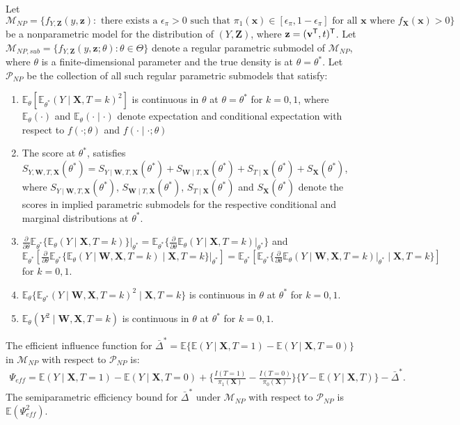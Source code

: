 \documentclass[useAMS,referee,usenatbib]{biom}
\def\bx{\mathbf{x}}
\def\bX{\mathbf{X}}
\def\bW{\mathbf{W}}
\def\bZ{\mathbf{Z}}
\def\bz{\mathbf{z}}
\def\bv{\mathbf{v}}
\def\Deltabarstr{\bar{\Delta}^*}
\def\thetastr{\theta^*}
\def\Mscr{\mathcal{M}}
\def\Pscr{\mathcal{P}}
\def\trans{^{\sf \tiny T}}
\def\ddtheta{\frac{\partial}{\partial\theta}}
\def\E{\mathbb{E}}
\begin{document}
\begin{lemma}
\label{l:npbnd}
Let $\Mscr_{NP} = \{ f_{Y,\bZ}(y,\bz) : \text{ there exists a } \epsilon_{\pi} > 0 \text{ such that } \pi_1(\bx) \in [\epsilon_{\pi},1-\epsilon_{\pi}] \text{ for all } \bx \text{ where } f_{\bX}(\bx)>0\}$ be a nonparametric model for the distribution of $(Y,\bZ)$, where $\bz=(\bv\trans,t)\trans$.  Let $\Mscr_{NP,sub} = \{ f_{Y,\bZ}(y,\bz;\theta):\theta \in \Theta\}$ denote a regular parametric submodel of $\Mscr_{NP}$, where $\theta$ is a finite-dimensional parameter and the true density is at $\theta=\thetastr$.  Let $\Pscr_{NP}$ be the collection of all such regular parametric submodels that satisfy:
\begin{enumerate}
\item $\E_{\theta}[\E_{\thetastr}(Y\mid\bX,T=k)^2]$ is continuous in $\theta$ at $\theta=\thetastr$ for $k=0,1$, where $\E_{\theta}(\cdot)$ and $\E_{\theta}(\cdot \mid \cdot)$ denote expectation and conditional expectation with respect to $f(\cdot;\theta)$ and $f(\cdot\mid\cdot;\theta)$
\item The score at $\thetastr$, satisfies $S_{Y,\bW,T,\bX}(\thetastr)=S_{Y\mid\bW,T,\bX}(\thetastr)+ S_{\bW\mid T,\bX}(\thetastr) + S_{T\mid \bX}(\thetastr) + S_{\bX}(\thetastr)$, where $S_{Y\mid \bW,T,\bX}(\thetastr)$, $S_{\bW\mid T,\bX}(\thetastr)$, $S_{T\mid \bX}(\thetastr)$ and $S_{\bX}(\thetastr)$ denote the scores in implied parametric submodels for the respective conditional and marginal distributions at $\thetastr$.
\item $\ddtheta \E_{\thetastr}\{ \E_{\theta}(Y\mid \bX,T=k)\}\Big|_{\thetastr} = \E_{\thetastr}\{ \ddtheta \E_{\theta}(Y\mid \bX,T=k)\Big|_{\thetastr}\}$ and $\E_{\thetastr}[ \ddtheta \E_{\thetastr}\{\E_{\theta}(Y\mid \bW,\bX,T=k)\mid \bX,T=k\}\Big|_{\thetastr}]= \E_{\thetastr}[ \E_{\thetastr}\{\ddtheta \E_{\theta}(Y\mid \bW,\bX,T=k)\Big|_{\thetastr}\mid \bX,T=k\}]$ for $k=0,1$.
\item $\E_{\theta}\{ \E_{\thetastr}(Y\mid \bW,\bX,T=k)^2\mid \bX,T=k\}$ is continuous in $\theta$ at $\thetastr$ for $k=0,1$.
\item $\E_{\theta}(Y^2\mid \bW,\bX,T=k)$ is continuous in $\theta$ at $\thetastr$ for $k=0,1$.
\end{enumerate}
The efficient influence function for $\Deltabarstr = \E\{ \E(Y\mid \bX,T=1) - \E(Y\mid \bX,T=0)\}$ in $\Mscr_{NP}$ with respect to $\Pscr_{NP}$ is:
\begin{align*}
\Psi_{eff} = \E(Y\mid \bX,T=1)-\E(Y\mid \bX,T=0) + \{ \frac{I(T=1)}{\pi_1(\bX)} - \frac{I(T=0)}{\pi_0(\bX)}\}\{Y - \E(Y\mid \bX,T)\} - \Deltabarstr.
\end{align*}
The semiparametric efficiency bound for $\Deltabarstr$ under $\Mscr_{NP}$ with respect to $\Pscr_{NP}$ is $\E(\Psi_{eff}^2)$.
\end{lemma}
\end{document}
